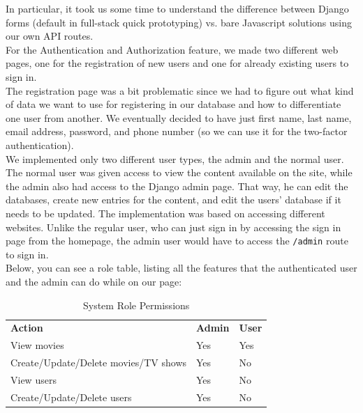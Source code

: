 \documentclass[letterpaper,twocolumn]{article}
\begin{document}
In particular, it took us some time to understand the difference between Django forms (default in full-stack quick prototyping) vs. bare Javascript solutions using our own API routes. \\

For the Authentication and Authorization feature, we made two different web pages, one for the registration of new users and one for already existing users to sign in. \\

The registration page was a bit problematic since we had to figure out what kind of data we want to use for registering in our database and how to differentiate one user from another. We eventually decided to have just first name, last name, email address, password, and phone number (so we can use it for the two-factor authentication).  \\

We implemented only two different user types, the admin and the normal user. The normal user was given access to view the content available on the site, while the admin also had access to the Django admin page. That way, he can edit the databases, create new entries for the content, and edit the users' database if it needs to be updated. The implementation was based on accessing different websites. Unlike the regular user, who can just sign in by accessing the sign in page from the homepage, the admin user would have to access the \texttt{/admin} route to sign in. \\

Below, you can see a role table, listing all the features that the authenticated user and the admin can do while on our page:

\begin{table}[h!]
\centering
\setlength{\arrayrulewidth}{1mm}
\renewcommand{\arraystretch}{1.8}
\setlength{\tabcolsep}{5pt}
\begin{tabular}{>{\centering\arraybackslash}p{4cm}>{\centering\arraybackslash}p{1.5cm}>{\centering\arraybackslash}p{1.5cm}}
\toprule
\multicolumn{3}{c}{\textbf{Role Permissions}} \\
\midrule
\textbf{Action} & \textbf{Admin} & \textbf{User} \\
\midrule
View movies & \textcolor{green!70!black}{Yes} & \textcolor{green!70!black}{Yes} \\
Create/Update/Delete movies/TV shows & \textcolor{green!70!black}{Yes} & \textcolor{red!70!black}{No} \\
View users & \textcolor{green!70!black}{Yes} & \textcolor{red!70!black}{No} \\
Create/Update/Delete users & \textcolor{green!70!black}{Yes} & \textcolor{red!70!black}{No} \\
\bottomrule
\end{tabular}
\caption{System Role Permissions}
\end{table}
\end{document}
